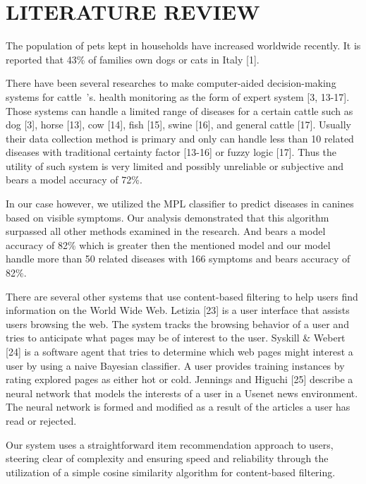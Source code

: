 \section{LITERATURE REVIEW}

The population of pets kept in households have increased worldwide recently. It is reported that
43\% of families own dogs or cats in Italy [1].

\noindent There have been several researches to make computer-aided decision-making systems for cattle~\textquoteright s. health monitoring as the form of expert system [3, 13-17]. Those systems can handle a limited range
of diseases for a certain cattle such as dog [3], horse [13], cow [14], fish [15], swine [16], and general cattle
[17]. Usually their data collection method is primary and only can handle less than 10 related diseases with
traditional certainty factor [13-16] or fuzzy logic [17]. Thus the utility of such system is very limited
and possibly unreliable or subjective and bears a model accuracy of 72\%.

\noindent In our case however,  we utilized the MPL classifier to predict diseases in canines based on visible symptoms. Our analysis demonstrated that this algorithm surpassed all other methods examined in the research. And bears a model accuracy of 82\% which is greater then the mentioned model and our model handle more than 50 related diseases with 166 symptoms and bears accuracy of 82\%. 


\noindent There are several other systems that use content-based filtering to help
users find information on the World Wide Web. Letizia [23] is a user
interface that assists users browsing the web. The system tracks the browsing
behavior of a user and tries to anticipate what pages may be of interest to the user.
Syskill \& Webert [24] is a software agent that tries to determine
which web pages might interest a user by using a naive Bayesian classifier. A user
provides training instances by rating explored pages as either hot or cold. Jennings
and Higuchi [25] describe a neural network that models the
interests of a user in a Usenet news environment. The neural network is formed and
modified as a result of the articles a user has read or rejected.

\noindent Our system uses a straightforward item recommendation approach to users, steering clear of complexity and ensuring speed and reliability through the utilization of a simple cosine similarity algorithm for content-based filtering.



